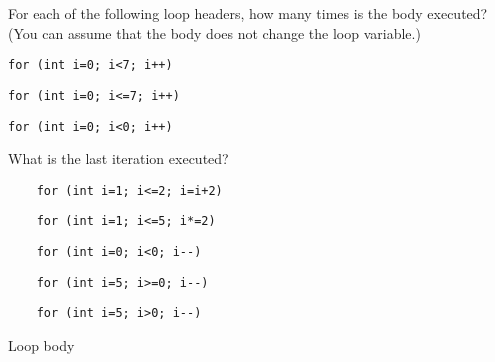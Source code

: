 \begin{review}
  \label{q:loop1}
  For each of the following loop headers, how many times is the body
  executed? (You can assume that the body does not change the loop variable.)

\begin{lstlisting}
for (int i=0; i<7; i++)
\end{lstlisting}

\begin{lstlisting}
for (int i=0; i<=7; i++)
\end{lstlisting}

\begin{lstlisting}
for (int i=0; i<0; i++)
\end{lstlisting}
\end{review}


\begin{review}
  \label{q:loop2}
  What is the last iteration executed?
  \begin{lstlisting}
    for (int i=1; i<=2; i=i+2)
  \end{lstlisting}

  \begin{lstlisting}
    for (int i=1; i<=5; i*=2)
  \end{lstlisting}

  \begin{lstlisting}
    for (int i=0; i<0; i--)
  \end{lstlisting}

  \begin{lstlisting}
    for (int i=5; i>=0; i--)
  \end{lstlisting}

  \begin{lstlisting}
    for (int i=5; i>0; i--)
  \end{lstlisting}
\end{review}


 {Loop body}


